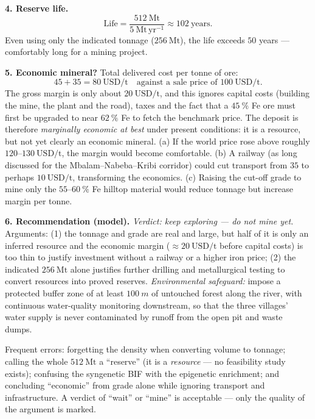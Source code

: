 \documentclass[11pt]{article}
\newcommand{\cle}[1]{{\popxbold\color{popdark}#1}}
\begin{document}
\textbf{4. Reserve life.}
\[
\text{Life} = \dfrac{512\ \mathrm{Mt}}{5\ \mathrm{Mt\,yr^{-1}}} \approx 102\ \text{years}.
\]
Even using only the indicated tonnage ($256\ \mathrm{Mt}$), the life exceeds $50$ years --- comfortably long for a mining project.

\textbf{5. Economic mineral?} Total delivered cost per tonne of ore:
\[
45 + 35 = 80\ \text{USD/t} \quad\text{against a sale price of } 100\ \text{USD/t}.
\]
The gross margin is only about $20\ \text{USD/t}$, and this ignores capital costs (building the mine, the plant and the road), taxes and the fact that a $45\ \%$ Fe ore must first be upgraded to near $62\ \%$ Fe to fetch the benchmark price. The deposit is therefore \emph{marginally economic at best} under present conditions: it is a \cle{resource}, but not yet clearly an \cle{economic mineral}. (a) If the world price rose above roughly $120$--$130\ \text{USD/t}$, the margin would become comfortable. (b) A railway (as long discussed for the Mbalam--Nabeba--Kribi corridor) could cut transport from $35$ to perhaps $10\ \text{USD/t}$, transforming the economics. (c) Raising the \cle{cut-off grade} to mine only the $55$--$60\ \%$ Fe hilltop material would reduce tonnage but increase margin per tonne.

\textbf{6. Recommendation (model).} \emph{Verdict: keep exploring --- do not mine yet.} Arguments: (1) the tonnage and grade are real and large, but half of it is only an inferred resource and the economic margin ($\approx 20\ \text{USD/t}$ before capital costs) is too thin to justify investment without a railway or a higher iron price; (2) the indicated $256\ \mathrm{Mt}$ alone justifies further drilling and metallurgical testing to convert resources into proved reserves. \emph{Environmental safeguard:} impose a protected buffer zone of at least $\SI{100}{m}$ of untouched forest along the river, with continuous water-quality monitoring downstream, so that the three villages' water supply is never contaminated by runoff from the open pit and waste dumps.

\begin{attention}
Frequent errors: forgetting the density when converting volume to tonnage; calling the whole $512\ \mathrm{Mt}$ a ``reserve'' (it is a \emph{resource} --- no feasibility study exists); confusing the syngenetic BIF with the epigenetic enrichment; and concluding ``economic'' from grade alone while ignoring transport and infrastructure. A verdict of ``wait'' or ``mine'' is acceptable --- only the quality of the argument is marked.
\end{attention}
\end{document}
